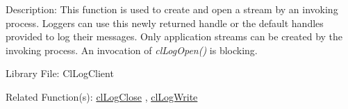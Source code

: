 \begin{Desc}
\item[Description:]This function is used to create and open a stream by an invoking process. Loggers can use this newly returned handle or the default
handles provided to log their messages. Only application streams can be created by the invoking process. An invocation of \textit{clLogOpen()} 
is blocking.\end{Desc}
\begin{Desc}
\item[Library File:]Cl\-Log\-Client\end{Desc}
\begin{Desc}
\item[Related Function(s):]\hyperlink{pagelog106}{cl\-Log\-Close} , \hyperlink{pagelog102}{cl\-Log\-Write} \end{Desc}
\newpage


